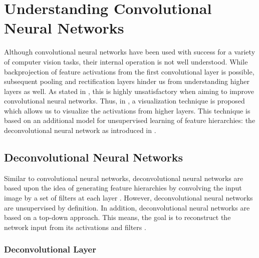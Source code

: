 \section{Understanding Convolutional Neural Networks}
\label{sec:understanding-convolutional-networks}

Although convolutional neural networks have been used with success for a variety of computer vision tasks, their internal operation is not well understood. While backprojection of feature activations from the first convolutional layer is possible, subsequent pooling and rectification layers hinder us from understanding higher layers as well. As stated in \cite{ZeilerFergus:2013}, this is highly unsatisfactory when aiming to improve convolutional neural networks. Thus, in \cite{ZeilerFergus:2013}, a visualization technique is proposed which allows us to visualize the activations from higher layers. This technique is based on an additional model for unsupervised learning of feature hierarchies: the deconvolutional neural network as introduced in \cite{ZeilerKrishnanTaylorFergus:2010}.

\subsection{Deconvolutional Neural Networks}

Similar to convolutional neural networks, deconvolutional neural networks are based upon the idea of generating feature hierarchies by convolving the input image by a set of filters at each layer \cite{ZeilerKrishnanTaylorFergus:2010}. However, deconvolutional neural networks are unsupervised by definition. In addition, deconvolutional neural networks are based on a top-down approach. This means, the goal is to reconstruct the network input from its activations and filters \cite{ZeilerKrishnanTaylorFergus:2010}.

\subsubsection{Deconvolutional Layer}

